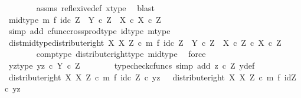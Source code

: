 \begin{isabellebody}
\ \ \ \ \ \ \isamarkupfalse%
\ assms\ reflexive{\isacharunderscore}{\kern0pt}def{}\ x{\isacharunderscore}{\kern0pt}type\ \isamarkupfalse%
\ blast\isanewline
\ \ \ \ \isamarkupfalse%
\ mid{\isacharunderscore}{\kern0pt}type{\isacharcolon}{\kern0pt}\ {\isachardoublequoteopen}m\ {\isasymtimes}\isactrlsub f\ id\isactrlsub c\ Z\ {\isacharcolon}{\kern0pt}\ Y\ {\isasymtimes}\isactrlsub c\ Z\ {\isasymrightarrow}\ {\isacharparenleft}{\kern0pt}X\ {\isasymtimes}\isactrlsub c\ X{\isacharparenright}{\kern0pt}\ {\isasymtimes}\isactrlsub c\ Z{\isachardoublequoteclose}\isanewline
\ \ \ \ \ \ \isamarkupfalse%
\ {\isacharparenleft}{\kern0pt}simp\ add{\isacharcolon}{\kern0pt}\ cfunc{\isacharunderscore}{\kern0pt}cross{\isacharunderscore}{\kern0pt}prod{\isacharunderscore}{\kern0pt}type\ id{\isacharunderscore}{\kern0pt}type\ m{\isacharunderscore}{\kern0pt}type{\isacharparenright}{\kern0pt}\isanewline
\ \ \ \ \isamarkupfalse%
\ dist{\isacharunderscore}{\kern0pt}mid{\isacharunderscore}{\kern0pt}type{\isacharcolon}{\kern0pt}{\isachardoublequoteopen}distribute{\isacharunderscore}{\kern0pt}right\ X\ X\ Z\ {\isasymcirc}\isactrlsub c\ m\ {\isasymtimes}\isactrlsub f\ id\isactrlsub c\ Z\ {\isacharcolon}{\kern0pt}\ Y\ {\isasymtimes}\isactrlsub c\ Z\ {\isasymrightarrow}\ {\isacharparenleft}{\kern0pt}X\ {\isasymtimes}\isactrlsub c\ Z{\isacharparenright}{\kern0pt}\ {\isasymtimes}\isactrlsub c\ X\ {\isasymtimes}\isactrlsub c\ Z{\isachardoublequoteclose}\isanewline
\ \ \ \ \ \ \isamarkupfalse%
\ comp{\isacharunderscore}{\kern0pt}type\ distribute{\isacharunderscore}{\kern0pt}right{\isacharunderscore}{\kern0pt}type\ mid{\isacharunderscore}{\kern0pt}type\ \isamarkupfalse%
\ force\isanewline
\isanewline
\ \ \ \ \isamarkupfalse%
\ yz{\isacharunderscore}{\kern0pt}type{\isacharcolon}{\kern0pt}\ {\isachardoublequoteopen}{\isasymlangle}y{\isacharcomma}{\kern0pt}z{\isasymrangle}\ {\isasymin}\isactrlsub c\ Y\ {\isasymtimes}\isactrlsub c\ Z{\isachardoublequoteclose}\isanewline
\ \ \ \ \ \ \isamarkupfalse%
\ {\isacharparenleft}{\kern0pt}typecheck{\isacharunderscore}{\kern0pt}cfuncs{\isacharcomma}{\kern0pt}\ simp\ add{\isacharcolon}{\kern0pt}\ {\isacartoucheopen}z\ {\isasymin}\isactrlsub c\ Z{\isacartoucheclose}\ y{\isacharunderscore}{\kern0pt}def{\isacharparenright}{\kern0pt}\isanewline
\ \ \ \ \isamarkupfalse%
\ {\isachardoublequoteopen}{\isacharparenleft}{\kern0pt}distribute{\isacharunderscore}{\kern0pt}right\ X\ X\ Z\ {\isasymcirc}\isactrlsub c\ m\ {\isasymtimes}\isactrlsub f\ id\isactrlsub c\ Z{\isacharparenright}{\kern0pt}\ {\isasymcirc}\isactrlsub c\ {\isasymlangle}y{\isacharcomma}{\kern0pt}z{\isasymrangle}\ \ {\isacharequal}{\kern0pt}\ distribute{\isacharunderscore}{\kern0pt}right\ X\ X\ Z\ {\isasymcirc}\isactrlsub c\ {\isacharparenleft}{\kern0pt}m\ {\isasymtimes}\isactrlsub f\ id{\isacharparenleft}{\kern0pt}Z{\isacharparenright}{\kern0pt}{\isacharparenright}{\kern0pt}\ {\isasymcirc}\isactrlsub c\ {\isasymlangle}y{\isacharcomma}{\kern0pt}z{\isasymrangle}{\isachardoublequoteclose}\isanewline

\end{isabellebody}

